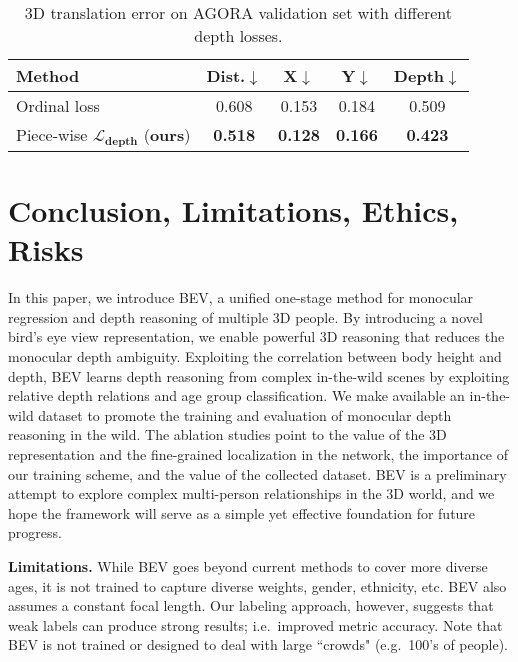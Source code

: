 \documentclass[10pt,twocolumn,letterpaper]{article}
\begin{document}
\begin{table}[t]
	\footnotesize
	\centering
	\begin{tabular}{l|c|ccc}
	\toprule
Method & Dist.$\downarrow$ & X$\downarrow$ & Y$\downarrow$& Depth$\downarrow$\\
\midrule
Ordinal loss~\cite{wang2020hmor} & 0.608 & 0.153 & 0.184 & 0.509 \\
Piece-wise $\boldsymbol{\mathcal{L}_{depth}}$ (\textbf{ours})  & \textbf{0.518} & \textbf{0.128} & \textbf{0.166} & \textbf{0.423} \\
\bottomrule
\end{tabular}
\vspace{-2mm}
	\caption{3D translation error on AGORA validation set with different depth losses.}\vspace{-2mm}
	\label{tab:Loss}
\end{table}


\vspace{-2mm}
\section{Conclusion, Limitations, Ethics, Risks}\vspace{-1mm}

In this paper, we introduce BEV, a unified one-stage method for monocular regression and depth reasoning of multiple 3D people.
By introducing a novel bird's eye view representation, we enable powerful 3D reasoning that reduces the monocular depth ambiguity.
Exploiting the correlation between body height and depth, BEV learns depth reasoning from complex in-the-wild scenes by exploiting relative depth relations and age group classification.
We make available an in-the-wild dataset to promote the training and evaluation of monocular depth reasoning in the wild.
The ablation studies point to the value of the 3D representation and the fine-grained localization in the network, the importance of our training scheme, and the value of the collected dataset. 
BEV is a preliminary attempt to explore complex multi-person relationships in the 3D world, and we hope the framework will serve as a simple yet effective foundation for future progress. 


\textbf{Limitations.} 
While BEV goes beyond current methods to cover more diverse ages, it is not trained to capture diverse weights, gender, ethnicity, etc. 
BEV also assumes a constant focal length. 
Our labeling approach, however, suggests that weak labels can produce strong results; i.e.~improved metric accuracy.
Note that BEV is not trained or designed to deal with large ``crowds" (e.g.~100's of people). 
\end{document}

